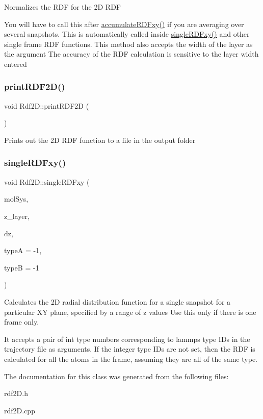 Normalizes the R\+DF for the 2D R\+DF

You will have to call this after \mbox{\hyperlink{classRdf2D_a6c716851d80fd2a7dcfefd219892d87b}{accumulate\+R\+D\+Fxy()}} if you are averaging over several snapshots. This is automatically called inside \mbox{\hyperlink{classRdf2D_afc5ff73aa9c126184e94ee3abfc14ff4}{single\+R\+D\+Fxy()}} and other single frame R\+DF functions. This method also accepts the width of the layer as the argument The accuracy of the R\+DF calculation is sensitive to the layer width entered \mbox{\label{classRdf2D_aae00c1526117f6ac63d2c13354b6c404}} 
\subsubsection{\texorpdfstring{print\+R\+D\+F2\+D()}{printRDF2D()}}
{\footnotesize\ttfamily void Rdf2\+D\+::print\+R\+D\+F2D (\begin{DoxyParamCaption}{ }\end{DoxyParamCaption})}

Prints out the 2D R\+DF function to a file in the output folder \mbox{\label{classRdf2D_afc5ff73aa9c126184e94ee3abfc14ff4}} 
\subsubsection{\texorpdfstring{single\+R\+D\+Fxy()}{singleRDFxy()}}
{\footnotesize\ttfamily void Rdf2\+D\+::single\+R\+D\+Fxy (\begin{DoxyParamCaption}\item[{class \mbox{\hyperlink{classCMolecularSystem}{C\+Molecular\+System}} \&}]{mol\+Sys,  }\item[{double}]{z\+\_\+layer,  }\item[{double}]{dz,  }\item[{int}]{typeA = {\ttfamily -\/1},  }\item[{int}]{typeB = {\ttfamily -\/1} }\end{DoxyParamCaption})}

Calculates the 2D radial distribution function for a single snapshot for a particular XY plane, specified by a range of z values Use this only if there is one frame only.

It accepts a pair of int type numbers corresponding to lammps type I\+Ds in the trajectory file as arguments. If the integer type I\+Ds are not set, then the R\+DF is calculated for all the atoms in the frame, assuming they are all of the same type. 

The documentation for this class was generated from the following files\+:\begin{DoxyCompactItemize}
\item 
rdf2\+D.\+h\item 
rdf2\+D.\+cpp\end{DoxyCompactItemize}
